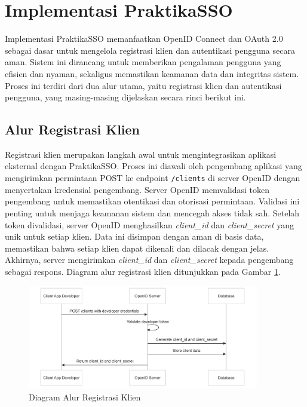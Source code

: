 \section{Implementasi PraktikaSSO}
Implementasi PraktikaSSO memanfaatkan OpenID Connect dan OAuth 2.0 sebagai dasar untuk mengelola registrasi klien dan autentikasi pengguna secara aman. Sistem ini dirancang untuk memberikan pengalaman pengguna yang efisien dan nyaman, sekaligus memastikan keamanan data dan integritas sistem. Proses ini terdiri dari dua alur utama, yaitu registrasi klien dan autentikasi pengguna, yang masing-masing dijelaskan secara rinci berikut ini.

\subsection{Alur Registrasi Klien}
Registrasi klien merupakan langkah awal untuk mengintegrasikan aplikasi eksternal dengan PraktikaSSO. Proses ini diawali oleh pengembang aplikasi yang mengirimkan permintaan POST ke endpoint \texttt{/clients} di server OpenID dengan menyertakan kredensial pengembang. Server OpenID memvalidasi token pengembang untuk memastikan otentikasi dan otorisasi permintaan. Validasi ini penting untuk menjaga keamanan sistem dan mencegah akses tidak sah. Setelah token divalidasi, server OpenID menghasilkan \emph{client\_id} dan \emph{client\_secret} yang unik untuk setiap klien. Data ini disimpan dengan aman di basis data, memastikan bahwa setiap klien dapat dikenali dan dilacak dengan jelas. Akhirnya, server mengirimkan \emph{client\_id} dan \emph{client\_secret} kepada pengembang sebagai respons.  Diagram alur registrasi klien ditunjukkan pada Gambar \ref{fig:client_registration}.

\begin{figure}[H]
    \centering
    \includegraphics[width=0.9\textwidth]{gambar/create_client_flow.png}
    \caption{Diagram Alur Registrasi Klien}
    \label{fig:client_registration}
\end{figure}

